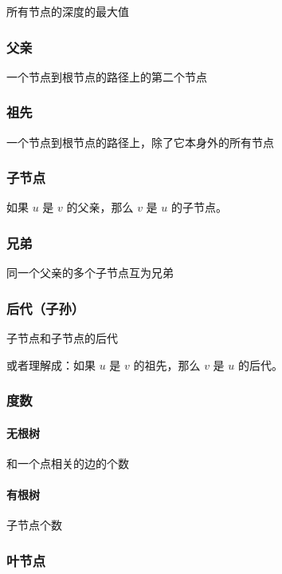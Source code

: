 所有节点的深度的最大值

\subsubsection{父亲}

一个节点到根节点的路径上的第二个节点

\subsubsection{祖先}

一个节点到根节点的路径上，除了它本身外的所有节点

\subsubsection{子节点}

如果 $u$ 是 $v$ 的父亲，那么 $v$ 是 $u$ 的子节点。

\subsubsection{兄弟}

同一个父亲的多个子节点互为兄弟

\subsubsection{后代（子孙）}

子节点和子节点的后代

或者理解成：如果 $u$ 是 $v$ 的祖先，那么 $v$ 是 $u$ 的后代。

\subsubsection{度数}

\paragraph{无根树}

和一个点相关的边的个数

\paragraph{有根树}

子节点个数

\subsubsection{叶节点}

